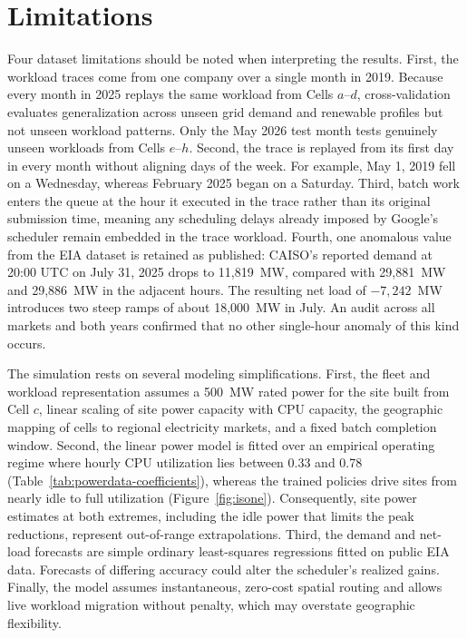 \documentclass{UNCC-thesis}
\begin{document}
\section{Limitations}
\label{sec:limitations}

Four dataset limitations should be noted when interpreting the results. First, the workload traces
come from one company over a single month in 2019. Because every month in 2025 replays the same
workload from Cells \(a\)--\(d\), cross-validation evaluates generalization across unseen grid
demand and renewable profiles but not unseen workload patterns. Only the May 2026 test month tests
genuinely unseen workloads from Cells \(e\)--\(h\). Second, the trace is replayed from its first
day in every month without aligning days of the week. For example, May 1, 2019 fell on a
Wednesday, whereas February 2025 began on a Saturday. Third, batch work enters the queue at the
hour it executed in the trace rather than its original submission time, meaning any scheduling
delays already imposed by Google's scheduler remain embedded in the trace workload. Fourth, one
anomalous value from the EIA dataset is retained as published: CAISO's reported demand at
20:00 UTC on July 31, 2025 drops to 11,819~MW, compared with 29,881~MW and 29,886~MW in the
adjacent hours. The resulting net load of \(-7{,}242\)~MW introduces two steep ramps of about
18,000~MW in July. An audit across all markets and both years confirmed that no other single-hour
anomaly of this kind occurs.

The simulation rests on several modeling simplifications. First, the fleet and workload
representation assumes a 500~MW rated power for the site built from Cell \(c\), linear scaling of
site power capacity with CPU capacity, the geographic mapping of cells to regional electricity
markets, and a fixed batch completion window. Second, the linear power model is fitted over an
empirical operating regime where hourly CPU utilization lies between 0.33 and 0.78
(Table~\ref{tab:powerdata-coefficients}), whereas the trained policies drive sites from nearly
idle to full utilization (Figure~\ref{fig:isone}). Consequently, site power estimates at both
extremes, including the idle power that limits the peak reductions, represent out-of-range
extrapolations. Third, the demand and net-load forecasts are simple ordinary least-squares
regressions fitted on public EIA data. Forecasts of differing accuracy could alter the scheduler's
realized gains. Finally, the model assumes instantaneous, zero-cost spatial routing and allows live
workload migration without penalty, which may overstate geographic flexibility.
\end{document}
